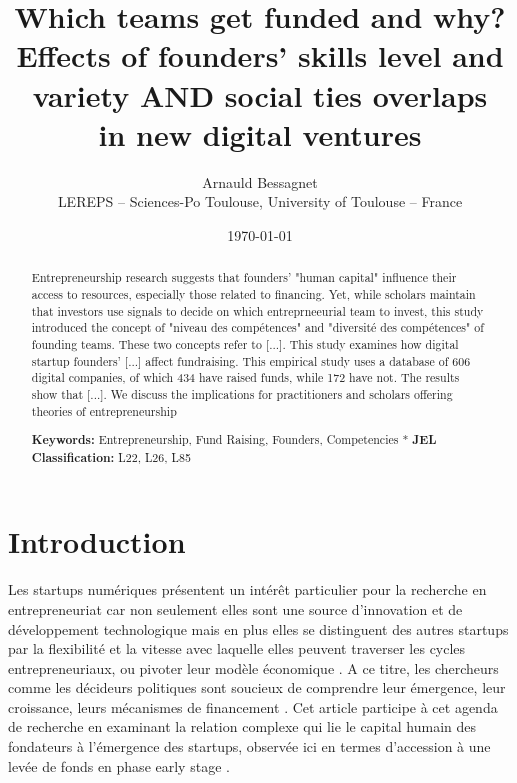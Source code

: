 \documentclass[11pt]{article}
\begin{document}
\title{Which teams get funded and why? \\ Effects of founders' skills level and variety AND social ties overlaps \\ in new digital ventures}

\author{Arnauld Bessagnet \\ \footnotesize{LEREPS – Sciences-Po Toulouse, University of Toulouse – France} \\}

\date{\today}
\maketitle

\begin{abstract}
\noindent
Entrepreneurship research suggests that founders' "human capital" influence their access to resources, especially those related to financing. Yet, while scholars maintain that investors use signals to decide on which entreprneeurial team to invest, this study introduced the concept of "niveau des compétences" and "diversité des compétences" of founding teams. These two concepts refer to [...]. This study examines how digital startup founders' [...] affect fundraising. This empirical study uses a database of 606 digital companies, of which 434 have raised funds, while 172 have not. The results show that [...]. We discuss the implications for practitioners and scholars offering theories of entrepreneurship \newline

\noindent \textbf{Keywords:} Entrepreneurship, Fund Raising, Founders, Competencies \newline
*
\noindent \textbf{JEL Classification:} L22, L26, L85

\end{abstract}

\clearpage
\section{Introduction}

Les startups numériques présentent un intérêt particulier pour la recherche en entrepreneuriat car non seulement elles sont une source d'innovation et de développement technologique mais en plus elles se distinguent des autres startups par la flexibilité et la vitesse avec laquelle elles peuvent traverser les cycles entrepreneuriaux, ou pivoter leur modèle économique \citep{nambisan2017digital}. A ce titre, les chercheurs comme les décideurs politiques sont soucieux de comprendre leur émergence, leur croissance, leurs mécanismes de financement \citep{klein2020start}. Cet article participe à cet agenda de recherche en examinant la relation complexe qui lie le capital humain des fondateurs à l'émergence des startups, observée ici en termes d'accession à une levée de fonds en phase early stage \citep{pinelli2020too}.
\end{document}
